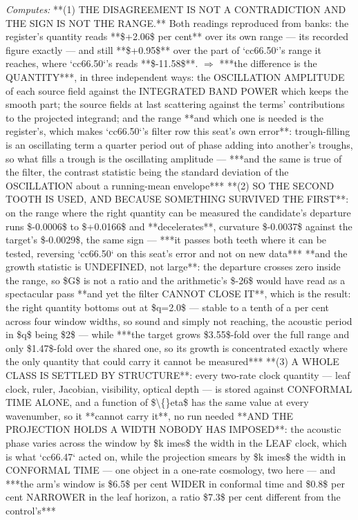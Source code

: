 \begin{description}
\emph{Computes:}  **(1) THE DISAGREEMENT IS NOT A CONTRADICTION AND THE SIGN IS NOT THE RANGE.** Both readings reproduced from banks: the register's quantity reads **\$+2.06\$ per cent** over its own range --- its recorded figure exactly --- and still **\$+0.95\$** over the part of `cc66.50`'s range it reaches, where `cc66.50`'s reads **\$-11.58\$**. \ensuremath{\Rightarrow} ***the difference is the QUANTITY***, in three independent ways: the OSCILLATION AMPLITUDE of each source field against the INTEGRATED BAND POWER which keeps the smooth part; the source fields at last scattering against the terms' contributions to the projected integrand; and the range   **and which one is needed is the register's, which makes `cc66.50`'s filter row this seat's own error**: trough-filling is an oscillating term a quarter period out of phase adding into another's troughs, so what fills a trough is the oscillating amplitude --- ***and the same is true of the filter, the contrast statistic being the standard deviation of the OSCILLATION about a running-mean envelope***   **(2) SO THE SECOND TOOTH IS USED, AND BECAUSE SOMETHING SURVIVED THE FIRST**: on the range where the right quantity can be measured the candidate's departure runs \$-0.0006\$ to \$+0.0166\$ and **decelerates**, curvature \$-0.0037\$ against the target's \$-0.0029\$, the same sign --- ***it passes both teeth where it can be tested, reversing `cc66.50` on this seat's error and not on new data***   **and the growth statistic is UNDEFINED, not large**: the departure crosses zero inside the range, so \$G\$ is not a ratio and the arithmetic's \$-26\$ would have read as a spectacular pass   **and yet the filter CANNOT CLOSE IT**, which is the result: the right quantity bottoms out at \$q=2.0\$ --- stable to a tenth of a per cent across four window widths, so sound and simply not reaching, the acoustic period in \$q\$ being \$2\$ --- while ***the target grows \$3.55\$-fold over the full range and only \$1.47\$-fold over the shared one, so its growth is concentrated exactly where the only quantity that could carry it cannot be measured***   **(3) A WHOLE CLASS IS SETTLED BY STRUCTURE**: every two-rate clock quantity --- leaf clock, ruler, Jacobian, visibility, optical depth --- is stored against CONFORMAL TIME ALONE, and a function of \$\textbackslash\{\}eta\$ has the same value at every wavenumber, so it **cannot carry it**, no run needed   **AND THE PROJECTION HOLDS A WIDTH NOBODY HAS IMPOSED**: the acoustic phase varies across the window by \$k	imes\$ the width in the LEAF clock, which is what `cc66.47` acted on, while the projection smears by \$k	imes\$ the width in CONFORMAL TIME --- one object in a one-rate cosmology, two here --- and ***the arm's window is \$6.5\$ per cent WIDER in conformal time and \$0.8\$ per cent NARROWER in the leaf horizon, a ratio \$7.3\$ per cent different from the control's***

\end{description}
